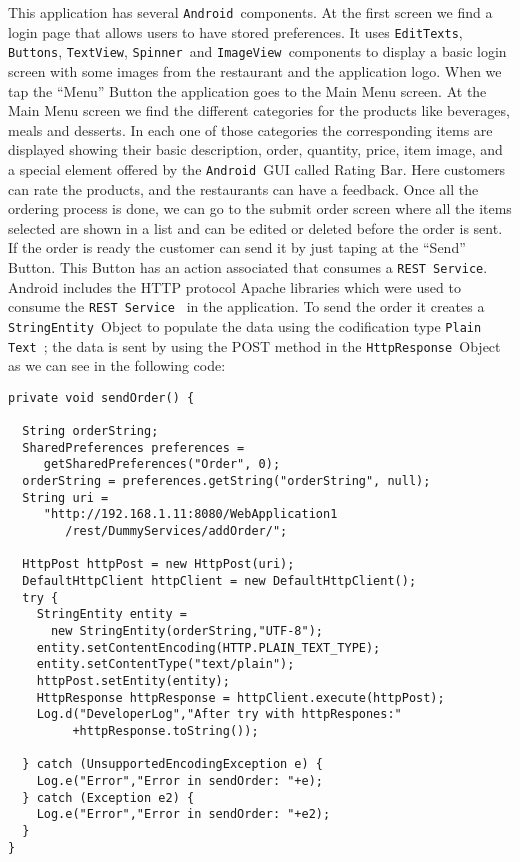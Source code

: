 \documentclass[journal]{IEEEtran}
\newcommand{\andrs}{\texttt{Android~}}
\newcommand{\rests}{\texttt{REST Service}}
\newcommand{\restss}{\texttt{REST Service~}}
\newcommand{\stres}{\texttt{StringEntity~}}
\newcommand{\httpres}{\texttt{HttpResponse~}}
\newcommand{\edte}{\texttt{EditTexts}}
\newcommand{\but}{\texttt{Buttons}}
\newcommand{\texv}{\texttt{TextView}}
\newcommand{\spins}{\texttt{Spinner~}}
\newcommand{\imvis}{\texttt{ImageView~}}
\newcommand{\pltes}{\texttt{Plain Text~}}
\begin{document}
This application has several \andrs components. At the first screen we find a login page that allows users to have stored
preferences. It uses \edte, \but, \texv, \spins and \imvis components to display a basic login screen with some images from the
restaurant and  the application logo. When we tap the ``Menu'' Button the application goes to the Main Menu screen. At the Main Menu 
screen we find the different categories for the products like beverages, meals and desserts. In each one of those categories the 
corresponding items are displayed showing their basic description, order, quantity, price, item image, and a special element offered 
by the \andrs GUI called Rating Bar. Here customers can rate the products, and the restaurants can have a feedback.
Once all the ordering process is done, we can go to the submit order screen where all the items selected are shown in 
a list and can be edited or deleted before the order is sent. If the order is ready the customer can send it by just taping at 
the ``Send'' Button. This Button has an action associated that consumes a \rests\cite{rest}.  \\

Android includes the HTTP protocol Apache  libraries which were used to consume the \restss\cite{rest} in the application. To 
send the order it creates  a \stres Object to populate the data using the codification type \pltes; the data is sent by using the
POST method in the \httpres Object as we can see in the following code:  

\lstset{language=Java, tabsize=2, showstringspaces=false}
\begin{scriptsize}\ttfamily\begin{lstlisting}
private void sendOrder() {

  String orderString;
  SharedPreferences preferences = 
     getSharedPreferences("Order", 0);
  orderString = preferences.getString("orderString", null);
  String uri = 
     "http://192.168.1.11:8080/WebApplication1
        /rest/DummyServices/addOrder/";

  HttpPost httpPost = new HttpPost(uri);
  DefaultHttpClient httpClient = new DefaultHttpClient();
  try {
    StringEntity entity = 
      new StringEntity(orderString,"UTF-8");
    entity.setContentEncoding(HTTP.PLAIN_TEXT_TYPE);
    entity.setContentType("text/plain");
    httpPost.setEntity(entity);
    HttpResponse httpResponse = httpClient.execute(httpPost);
    Log.d("DeveloperLog","After try with httpRespones:"
         +httpResponse.toString());
	            
  } catch (UnsupportedEncodingException e) {
    Log.e("Error","Error in sendOrder: "+e);
  } catch (Exception e2) {
    Log.e("Error","Error in sendOrder: "+e2);
  }
}
  
\end{lstlisting}\end{scriptsize}
\end{document}
